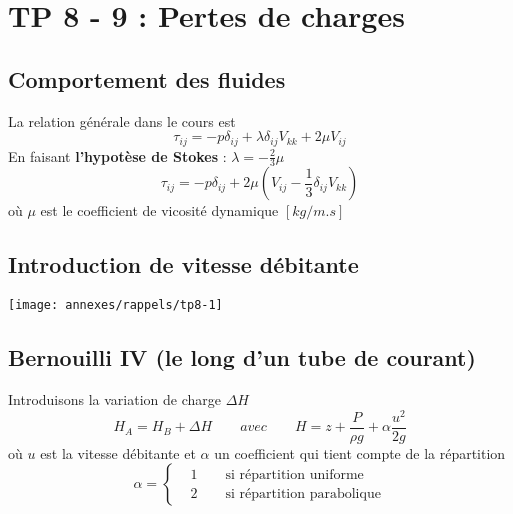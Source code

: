 
\section*{TP 8 - 9 : Pertes de charges}
\subsection*{Comportement des fluides}
La relation générale dans le cours est
\begin{equation}
	\tau _{ij} = -p\delta _{ij}+\lambda \delta _{ij} V_{kk} +2\mu V_{ij}
\end{equation}
En faisant \textbf{l'hypotèse de Stokes} : $\lambda = -\frac{2}{3}\mu$
\begin{equation}
	\tau _{ij} = -p\delta _{ij}+2\mu (V_{ij} -\frac{1}{3} \delta_{ij}V_{kk})
\end{equation}
où $\mu$ est le coefficient de vicosité dynamique $[kg/m.s]$

\subsection*{Introduction de vitesse débitante}
\begin{center}
	\texttt{[image: annexes/rappels/tp8-1]}
\end{center}

\subsection*{Bernouilli IV (le long d'un tube de courant)}
Introduisons la variation de charge $\Delta H$
\begin{equation}
	H_A = H_B + \Delta H \qquad avec \qquad H= z+\frac{P}{\rho g}+\alpha \frac{u^2}{2g}
\end{equation}
où $u$ est la vitesse débitante et $\alpha$ un coefficient qui tient compte de la répartition 
\begin{equation}
	\alpha = 
	\left\{
	\begin{aligned}
		  & 1 \qquad \mbox{si répartition uniforme}    \\
		  & 2 \qquad \mbox{si répartition parabolique} 
	\end{aligned}
	\right.
\end{equation}

